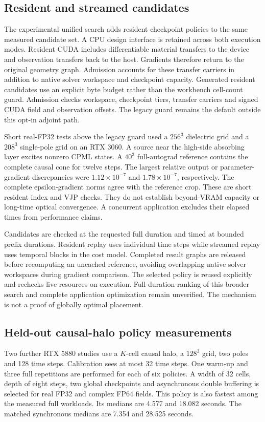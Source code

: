 \documentclass[11pt,a4paper]{article}
\begin{document}
\subsection{Resident and streamed candidates}
The experimental unified search adds resident checkpoint policies to the
same measured candidate set. A CPU design interface is retained across both
execution modes. Resident CUDA includes differentiable material transfers to
the device and observation transfers back to the host. Gradients therefore
return to the original geometry graph. Admission accounts for these transfer
carriers in addition to native solver workspace and checkpoint capacity.
Generated resident candidates use an explicit byte budget rather than the
workbench cell-count guard. Admission checks workspace, checkpoint tiers,
transfer carriers and signed CUDA field and observation offsets. The legacy
guard remains the default outside this opt-in adjoint path.

Short real-FP32 tests above the legacy guard used a $256^3$ dielectric grid
and a $208^3$ single-pole grid on an RTX 3060. A source near the high-side
absorbing layer excites nonzero CPML states. A $40^3$ full-autograd reference
contains the complete causal cone for twelve steps. The largest relative
output or parameter-gradient discrepancies were $1.12\times10^{-7}$ and
$1.78\times10^{-7}$, respectively. The complete epsilon-gradient norms agree
with the reference crop. These are short resident index and VJP checks.
They do not establish beyond-VRAM capacity or long-time optical convergence.
A concurrent application excludes their elapsed times from performance claims.

Candidates are checked at the requested full duration and timed at bounded
prefix durations. Resident replay uses individual time steps while streamed
replay uses temporal blocks in the cost model. Completed result graphs are
released before recomputing an uncached reference, avoiding overlapping
native solver workspaces during gradient comparison. The selected policy is
reused explicitly and rechecks live resources on execution. Full-duration
ranking of this broader search and complete application optimization remain
unverified. The mechanism is not a proof of globally optimal placement.

\subsection{Held-out causal-halo policy measurements}
Two further RTX 5880 studies use a $K$-cell causal halo, a $128^3$ grid,
two poles and 128 time steps. Calibration sees at most 32 time steps.
One warm-up and three full repetitions are performed for each of six
policies. A width of 32 cells, depth of eight steps, two global checkpoints
and asynchronous double buffering is selected for real FP32 and complex
FP64 fields. This policy is also fastest among the measured full workloads.
Its medians are 4.577 and 18.082 seconds. The matched synchronous medians
are 7.354 and 28.525 seconds.
\end{document}

